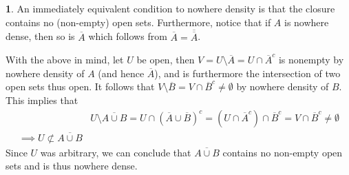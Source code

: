 \documentclass[10.5pt]{article}
\theoremstyle{definition}
\newtheorem{pb}{}
\begin{document}
    \begin{pb}
        An immediately equivalent condition to nowhere density is that the closure contains no (non-empty) open sets. Furthermore, notice that if \(A\) is nowhere dense, then so is \(\overline{A}\) which follows from \(\overline{A} = \overline{\overline{A}}\).

        With the above in mind, let \(U\) be open, then \(V = U \setminus \overline{A} = U \cap \overline{A}^c\) is nonempty by nowhere density of \(A\) (and hence \(\overline{A}\)), and is furthermore the intersection of two open sets thus open. It follows that \(V \setminus \overline{B} = V \cap \overline{B}^c \neq \emptyset\) by nowhere density of \(B\). This implies that
        \begin{align*}
            &U \setminus \overline{A\cup B} = U \cap (\overline{A}\cup \overline{B})^c = (U \cap \overline{A}^c) \cap \overline{B}^c = V \cap \overline{B}^c \neq \emptyset \\
            \implies U \not \subset \overline{A\cup B}
        \end{align*}
        Since \(U\) was arbitrary, we can conclude that \(\overline{A\cup B}\) contains no non-empty open sets and is thus nowhere dense.
    \end{pb}
\end{document}
